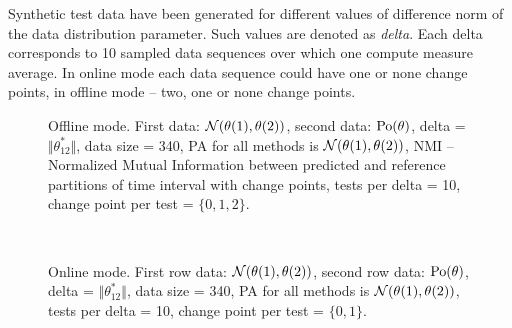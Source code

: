 Synthetic test data have been generated for different values of difference norm of the data distribution parameter. Such values are denoted as \textit{delta}. Each delta corresponds to 10 sampled data sequences over which one compute measure average.  In online mode each data sequence could have one or none change points,  in offline mode -- two, one or none change points.       

\begin{figure}[ht!]
     \begin{center}
         
         
%
    \end{center}
    \caption{%
        Offline mode. First data: $\mathcal{N}(\theta(1), \theta(2))$, second data: $\operatorname{Po}(\theta)$,
        delta = $\Vert \theta_{12}^{*} \Vert$, data size = 340, PA for all methods is $\mathcal{N}(\theta(1), \theta(2))$, NMI -- Normalized Mutual Information between predicted and reference partitions of time interval with change points, tests per delta = 10, change point per test = $\{0,1,2\}$.
     }%
   \label{fig:subfigures}
\end{figure}


\begin{figure}[ht!]
     \begin{center}
         \\%
%
    \end{center}
    \caption{%
       Online mode. First row data: $\mathcal{N}(\theta(1), \theta(2))$, second row data: $\operatorname{Po}(\theta)$,
        delta = $\Vert \theta_{12}^{*} \Vert$, data size = 340, PA for all methods is $\mathcal{N}(\theta(1), \theta(2))$, tests per delta = 10, change point per test = $\{0,1\}$.
     }%
   \label{fig:subfigures}
\end{figure}


